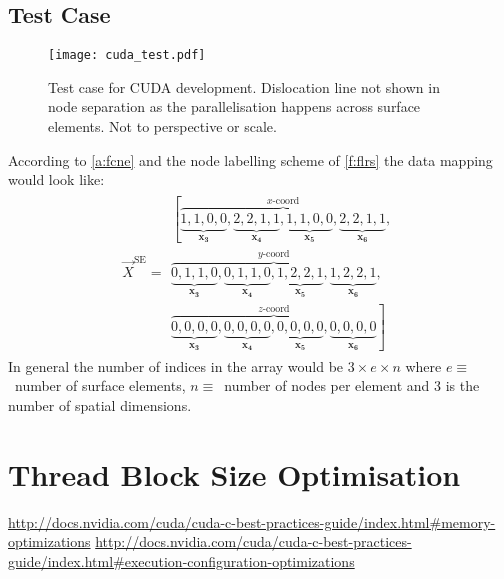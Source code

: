 	\subsection{Test Case}
	\begin{figure}
		\texttt{[image: cuda\_test.pdf]}
		\caption[Test case for CUDA development.]{Test case for CUDA development. Dislocation line not shown in node separation as the parallelisation happens across surface elements. Not to perspective or scale.}
		\label{f:cuda_test}
	\end{figure}
	According to \cref{a:fcne} and the node labelling scheme of \cref{f:flrs} the data mapping would look like:
	\begin{align}\label{e:cuda_test}
		\vec{X}^{\textrm{SE}} = 
		\begin{split}
			\left[\overbrace{\underbrace{1,1,0,0}_{\mathbf{x_{3}}}, \underbrace{2,2,1,1}_{\mathbf{x_{4}}},
				\underbrace{1,1,0,0}_{\mathbf{x_{5}}}, \underbrace{2,2,1,1}_{\mathbf{x_{6}}}}^{x\textrm{-coord}},\right.\\
			\overbrace{\underbrace{0,1,1,0}_{\mathbf{x_{3}}}, \underbrace{0,1,1,0}_{\mathbf{x_{4}}},
				\underbrace{1,2,2,1}_{\mathbf{x_{5}}}, \underbrace{1,2,2,1}_{\mathbf{x_{6}}}}^{y\textrm{-coord}},\\
			\left.\overbrace{\underbrace{0,0,0,0}_{\mathbf{x_{3}}}, \underbrace{0,0,0,0}_{\mathbf{x_{4}}},
				\underbrace{0,0,0,0}_{\mathbf{x_{5}}}, \underbrace{0,0,0,0}_{\mathbf{x_{6}}}}^{z\textrm{-coord}}\right]
		\end{split}
	\end{align}
	In general the number of indices in the array would be $ 3 \times e \times n $ where $ e \equiv $~number of surface elements, $ n \equiv $~number of nodes per element and 3 is the number of spatial dimensions.
	\section{Thread Block Size Optimisation}
	\href{http://docs.nvidia.com/cuda/cuda-c-best-practices-guide/index.html#memory-optimizations}{http://docs.nvidia.com/cuda/cuda-c-best-practices-guide/index.html\#memory-optimizations}
	\href{http://docs.nvidia.com/cuda/cuda-c-best-practices-guide/index.html#execution-configuration-optimizations}{http://docs.nvidia.com/cuda/cuda-c-best-practices-guide/index.html\#execution-configuration-optimizations}
	\savearabiccounter
